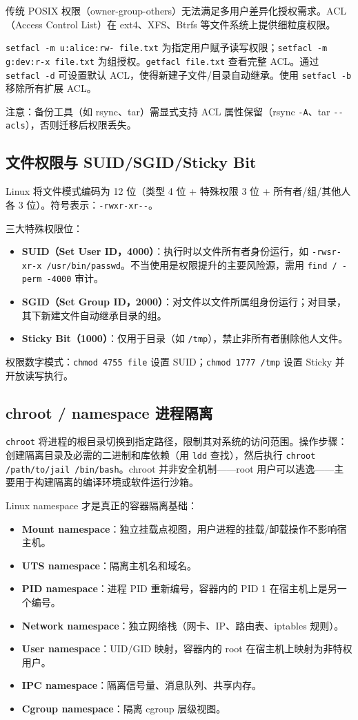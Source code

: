 \documentclass[12pt,UTF8]{ctexbook}
\begin{document}
传统 POSIX 权限（owner-group-others）无法满足多用户差异化授权需求。ACL（Access Control List）在 ext4、XFS、Btrfs 等文件系统上提供细粒度权限。

\verb|setfacl -m u:alice:rw- file.txt| 为指定用户赋予读写权限；\verb|setfacl -m g:dev:r-x file.txt| 为组授权。\verb|getfacl file.txt| 查看完整 ACL。通过 \verb|setfacl -d| 可设置默认 ACL，使得新建子文件/目录自动继承。使用 \verb|setfacl -b| 移除所有扩展 ACL。

注意：备份工具（如 rsync、tar）需显式支持 ACL 属性保留（rsync \verb|-A|、tar \verb|--acls|），否则迁移后权限丢失。

\subsection{文件权限与 SUID/SGID/Sticky Bit}

Linux 将文件模式编码为 12 位（类型 4 位 + 特殊权限 3 位 + 所有者/组/其他人各 3 位）。符号表示：\verb|-rwxr-xr--|。

三大特殊权限位：
\begin{itemize}
	\item \textbf{SUID（Set User ID，4000）}：执行时以文件所有者身份运行，如 \verb|-rwsr-xr-x /usr/bin/passwd|。不当使用是权限提升的主要风险源，需用 \verb|find / -perm -4000| 审计。
	\item \textbf{SGID（Set Group ID，2000）}：对文件以文件所属组身份运行；对目录，其下新建文件自动继承目录的组。
	\item \textbf{Sticky Bit（1000）}：仅用于目录（如 \verb|/tmp|），禁止非所有者删除他人文件。
\end{itemize}

权限数字模式：\verb|chmod 4755 file| 设置 SUID；\verb|chmod 1777 /tmp| 设置 Sticky 并开放读写执行。

\subsection{chroot / namespace 进程隔离}

\verb|chroot| 将进程的根目录切换到指定路径，限制其对系统的访问范围。操作步骤：创建隔离目录及必需的二进制和库依赖（用 \verb|ldd| 查找），然后执行 \verb|chroot /path/to/jail /bin/bash|。chroot 并非安全机制——root 用户可以逃逸——主要用于构建隔离的编译环境或软件运行沙箱。

Linux namespace 才是真正的容器隔离基础：
\begin{itemize}
	\item \textbf{Mount namespace}：独立挂载点视图，用户进程的挂载/卸载操作不影响宿主机。
	\item \textbf{UTS namespace}：隔离主机名和域名。
	\item \textbf{PID namespace}：进程 PID 重新编号，容器内的 PID 1 在宿主机上是另一个编号。
	\item \textbf{Network namespace}：独立网络栈（网卡、IP、路由表、iptables 规则）。
	\item \textbf{User namespace}：UID/GID 映射，容器内的 root 在宿主机上映射为非特权用户。
	\item \textbf{IPC namespace}：隔离信号量、消息队列、共享内存。
	\item \textbf{Cgroup namespace}：隔离 cgroup 层级视图。
\end{itemize}
\end{document}
